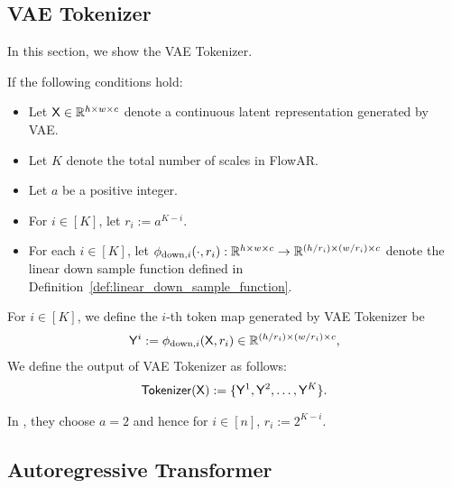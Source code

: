 \subsection{VAE Tokenizer}\label{sub:vae_tokenizer}
In this section, we show the VAE Tokenizer.

\begin{definition}\label{def:vae_tokenizer}
If the following conditions hold:
\begin{itemize}
    \item Let $\mathsf{X} \in \mathbb{R}^{h \times w \times c}$ denote a continuous latent representation generated by VAE.
    \item Let $K$ denote the total number of scales in FlowAR.
    \item Let $a$ be a positive integer.
    \item For $i \in [K]$, let $r_i := a^{K-i}$.
    \item For each $i\in [K]$, let $\phi_{\mathrm{down}, i}(\cdot , r_i) : \mathbb{R}^{h \times w \times c} \to \mathbb{R}^{(h / r_i) \times (w/r_i) \times c}$ denote the linear down sample function defined in Definition~\ref{def:linear_down_sample_function}.
\end{itemize}
For $i \in [K]$, we define the $i$-th token map generated by VAE Tokenizer be
\begin{align*}
    \mathsf{Y}^{i} := \phi_{\mathrm{down}, i}(\mathsf{X}, r_i) \in \mathbb{R}^{(h / r_i) \times (w/r_i) \times c},
\end{align*}
We define the output of VAE Tokenizer as follows:
    \begin{align*}
        \mathsf{Tokenizer}(\mathsf{X}) := \{\mathsf{Y}^{1},\mathsf{Y}^{2}, \dots,\mathsf{Y}^{K}\}.
    \end{align*}
\end{definition}
\begin{remark}
    In \cite{ryh+24}, they choose $a =2$ and hence for $i \in [n]$, $r_i := 2^{K-i}$.
\end{remark}

\subsection{Autoregressive Transformer}



